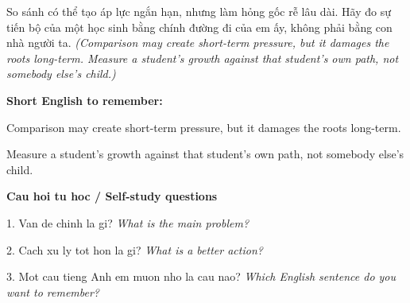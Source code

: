 \begin{baihoc}
So sánh có thể tạo áp lực ngắn hạn, nhưng làm hỏng gốc rễ lâu dài. Hãy đo sự tiến bộ của một học sinh bằng chính đường đi của em ấy, không phải bằng con nhà người ta.
\textit{(Comparison may create short-term pressure, but it damages the roots long-term. Measure a student’s growth against that student’s own path, not somebody else’s child.)}
\end{baihoc}

\begin{ghinhoanh}
\textbf{Short English to remember:}

Comparison may create short-term pressure, but it damages the roots long-term.

Measure a student’s growth against that student’s own path, not somebody else’s child.

\end{ghinhoanh}

\begin{tuhocnhanh}
\textbf{Cau hoi tu hoc / Self-study questions}

1. Van de chinh la gi? \textit{What is the main problem?}

2. Cach xu ly tot hon la gi? \textit{What is a better action?}

3. Mot cau tieng Anh em muon nho la cau nao? \textit{Which English sentence do you want to remember?}
\end{tuhocnhanh}
\ngancach


